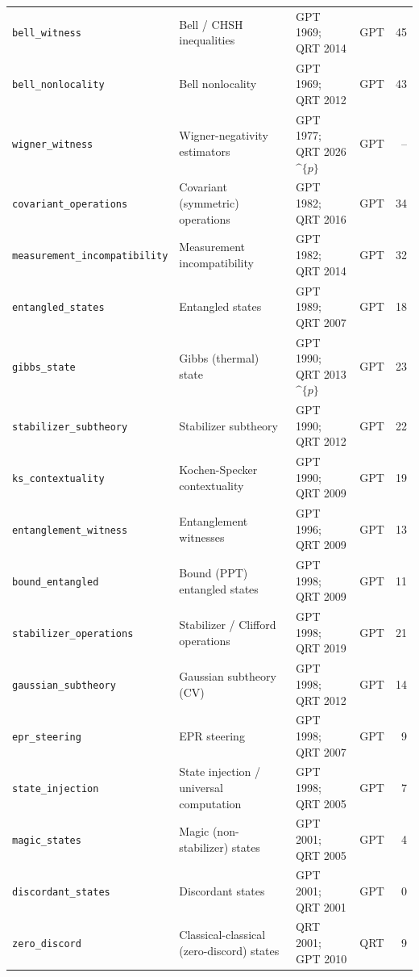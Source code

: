 \begin{longtable}{@{}p{3.1cm}p{3.6cm}p{4.3cm}lr@{}}
\texttt{bell\_\allowbreak{}witness} & Bell / CHSH inequalities & GPT 1969; QRT 2014 & GPT & 45 \\
\texttt{bell\_\allowbreak{}nonlocality} & Bell nonlocality & GPT 1969; QRT 2012 & GPT & 43 \\
\texttt{wigner\_\allowbreak{}witness} & Wigner-negativity estimators & GPT 1977; QRT 2026$\^{}\{p\}$ & GPT & -- \\
\texttt{covariant\_\allowbreak{}operations} & Covariant (symmetric) operations & GPT 1982; QRT 2016 & GPT & 34 \\
\texttt{measurement\_\allowbreak{}incompatibility} & Measurement incompatibility & GPT 1982; QRT 2014 & GPT & 32 \\
\texttt{entangled\_\allowbreak{}states} & Entangled states & GPT 1989; QRT 2007 & GPT & 18 \\
\texttt{gibbs\_\allowbreak{}state} & Gibbs (thermal) state & GPT 1990; QRT 2013$\^{}\{p\}$ & GPT & 23 \\
\texttt{stabilizer\_\allowbreak{}subtheory} & Stabilizer subtheory & GPT 1990; QRT 2012 & GPT & 22 \\
\texttt{ks\_\allowbreak{}contextuality} & Kochen-Specker contextuality & GPT 1990; QRT 2009 & GPT & 19 \\
\texttt{entanglement\_\allowbreak{}witness} & Entanglement witnesses & GPT 1996; QRT 2009 & GPT & 13 \\
\texttt{bound\_\allowbreak{}entangled} & Bound (PPT) entangled states & GPT 1998; QRT 2009 & GPT & 11 \\
\texttt{stabilizer\_\allowbreak{}operations} & Stabilizer / Clifford operations & GPT 1998; QRT 2019 & GPT & 21 \\
\texttt{gaussian\_\allowbreak{}subtheory} & Gaussian subtheory (CV) & GPT 1998; QRT 2012 & GPT & 14 \\
\texttt{epr\_\allowbreak{}steering} & EPR steering & GPT 1998; QRT 2007 & GPT & 9 \\
\texttt{state\_\allowbreak{}injection} & State injection / universal computation & GPT 1998; QRT 2005 & GPT & 7 \\
\texttt{magic\_\allowbreak{}states} & Magic (non-stabilizer) states & GPT 2001; QRT 2005 & GPT & 4 \\
\texttt{discordant\_\allowbreak{}states} & Discordant states & GPT 2001; QRT 2001 & GPT & 0 \\
\texttt{zero\_\allowbreak{}discord} & Classical-classical (zero-discord) states & QRT 2001; GPT 2010 & QRT & 9 \\

\end{longtable}
